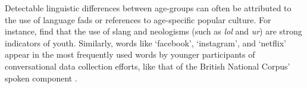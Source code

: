 Detectable linguistic differences between age-groups can often be attributed to the use of language fads or references to age-specific popular culture. For instance, \cite{schler2006effects} find that the use of slang and neologisms (such as \textit{lol} and \textit{ur}) are strong indicators of youth. Similarly, words like `facebook', `instagram', and `netflix' appear in the most frequently used words by younger participants of conversational data collection efforts, like that of the British National Corpus' spoken component \citep{love-spoken-bnc-2014}.



